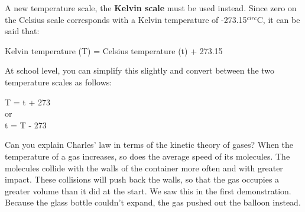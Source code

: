 A new temperature scale, the \textbf{Kelvin scale} must be used instead. Since zero on the Celsius scale corresponds with a Kelvin temperature of -273.15$^{circ}$C, it can be said that:

\begin{center}
Kelvin temperature (T) = Celsius temperature (t) + 273.15
\end{center}

At school level, you can simplify this slightly and convert between the two temperature scales as follows:

\begin{center}
T = t + 273\\

or\\

t = T - 273
\end{center}

Can you explain Charles' law in terms of the kinetic theory of gases? When the temperature of a gas increases, so does the average speed of its molecules. The molecules collide with the walls of the container more often and with greater impact. These collisions will push back the walls, so that the gas occupies a greater volume than it did at the start. We saw this in the first demonstration. Because the glass bottle couldn't expand, the gas pushed out the balloon instead. 

